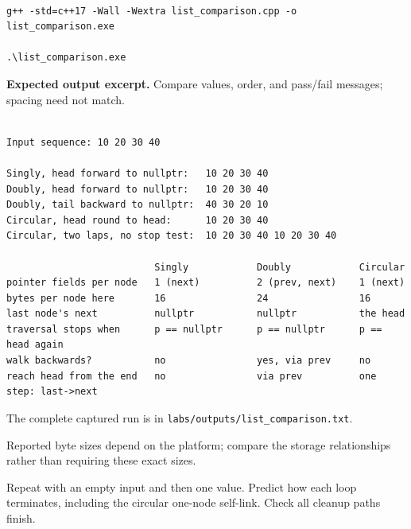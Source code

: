 \begin{lstlisting}[style=utpterminal,language={}]

g++ -std=c++17 -Wall -Wextra list_comparison.cpp -o list_comparison.exe

.\list_comparison.exe

\end{lstlisting}

\textbf{Expected output excerpt.} Compare values, order, and pass/fail messages; spacing need not match.

\begin{lstlisting}[style=utpterminal,language={}]

Input sequence: 10 20 30 40

Singly, head forward to nullptr:   10 20 30 40 
Doubly, head forward to nullptr:   10 20 30 40 
Doubly, tail backward to nullptr:  40 30 20 10 
Circular, head round to head:      10 20 30 40 
Circular, two laps, no stop test:  10 20 30 40 10 20 30 40 

                          Singly            Doubly            Circular
pointer fields per node   1 (next)          2 (prev, next)    1 (next)
bytes per node here       16                24                16
last node's next          nullptr           nullptr           the head
traversal stops when      p == nullptr      p == nullptr      p == head again
walk backwards?           no                yes, via prev     no
reach head from the end   no                via prev          one step: last->next

\end{lstlisting}

The complete captured run is in \texttt{labs/outputs/list\_comparison.txt}.

Reported byte sizes depend on the platform; compare the storage relationships rather than requiring these exact sizes.

\begin{tryit}

Repeat with an empty input and then one value. Predict how each loop terminates, including the circular one-node self-link. Check all cleanup paths finish.

\end{tryit}
